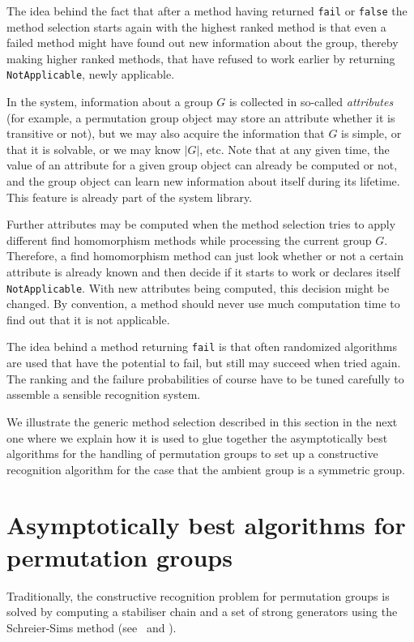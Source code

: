 The idea behind the fact that after a method having returned
\texttt{fail} or \texttt{false} the method selection starts again
with the highest ranked method is that even a failed method might
have found out new information about the group, thereby making
higher ranked methods, that have refused to work earlier by
returning \texttt{NotApplicable}, newly applicable.

In the {\GAP} system, information about a group $G$ is collected in
so-called {\em attributes} (for example,
a permutation group object may store an attribute whether it is transitive
or not), but we may also acquire the information that 
$G$ is simple, or that it is solvable, or we may know $|G|$, etc. 
Note that at any given time, the value of an attribute for a given group
object can already be computed or not, and the group object can learn new
information about itself during its lifetime. This feature is already
part of the {\GAP} system library. 

Further attributes may be
computed when the method selection tries to apply
different find homomorphism methods while processing the current group $G$.
Therefore, a find homomorphism method can just look whether or not
a certain attribute is already known and then decide if it starts
to work or declares itself \texttt{NotApplicable}. With new attributes
being computed, this decision might be changed. By convention, a method
should never use much computation time to find out that it is not
applicable.

The idea behind a method returning \texttt{fail} is that often
randomized algorithms are used that have the potential to fail,
but still may succeed when tried again. The ranking and the failure 
probabilities of course have to be tuned carefully to assemble
a sensible recognition system.

We illustrate the generic method selection described in this section
in the next one where we explain how it is used to glue together the
asymptotically best algorithms for the handling of permutation groups
to set up a constructive recognition algorithm for the case that the
ambient group is a symmetric group.

\section{Asymptotically best algorithms for permutation groups}
\label{permgrps}

Traditionally, the constructive recognition problem for permutation
groups is solved by computing a stabiliser chain and a set of strong
generators using the Schreier-Sims method (see~\cite{Si} and \cite{Ser}). 

